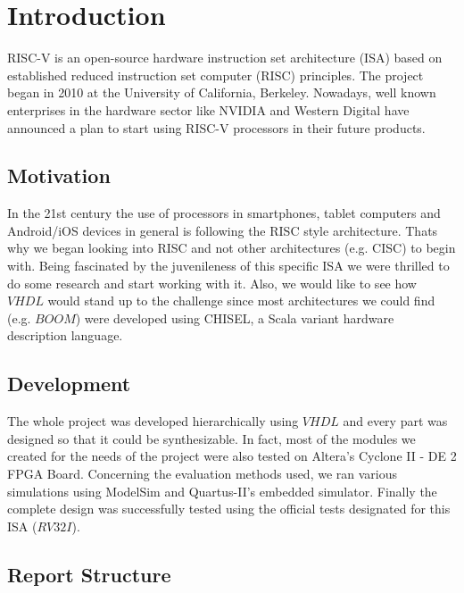 



%

\chapterfont{\raggedleft}
\chapter{Introduction}

	\minitoc 
	\vspace{5mm}
	RISC-V is an open-source hardware instruction set architecture (ISA) based on established reduced instruction set computer (RISC) principles. The project began in 2010 at the University of California, Berkeley. Nowadays, well known enterprises in the hardware sector like NVIDIA and Western Digital have announced a plan to start using RISC-V processors in their future products.
	\section{Motivation}

	\label{sec:Motivation}
	
	In the 21st century the use of processors in smartphones, tablet computers and Android/iOS devices in general is following the RISC style architecture. Thats why we began looking into RISC and not other architectures (e.g. CISC) to begin with. Being fascinated by the juvenileness of this specific ISA we were thrilled to do some research and start working with it. 
	Also, we would like to see how $VHDL$ would stand up to the challenge since most architectures we could find (e.g. $BOOM$) were developed using CHISEL, a Scala variant hardware description language.
	
	\section{Development}
	\label{sec:Dev}
	The whole project was developed hierarchically using $VHDL$ and every part was designed so that it could be synthesizable. In fact, most of the modules we created for the needs of the project were also tested on Altera's Cyclone II - DE 2 FPGA Board. Concerning the evaluation methods used, we ran various simulations using ModelSim and Quartus-II's embedded simulator. Finally the complete design was successfully tested using the official tests designated for this ISA ($RV32I$).
	\section{Report Structure}
	\label{sec:Structure}
	
